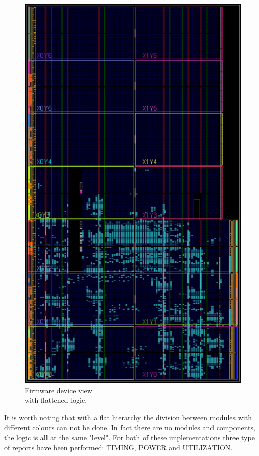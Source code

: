 \begin{figure}[H]
\begin{minipage}{.5\textwidth}
		\includegraphics[width=.85\linewidth]{IMG/ch4/FirmwareFLAT/DEVICE}
		\caption{Firmware device view \\with flattened logic.}
		\label{fig:flatdevice}
	\end{minipage}
\end{figure}
\noindent It is worth noting that with a flat hierarchy the division between modules with different colours can not be done. In fact there are no modules and components, the logic is all at the same "level".
For both of these implementations three type of reports have been performed: TIMING, POWER and UTILIZATION.

